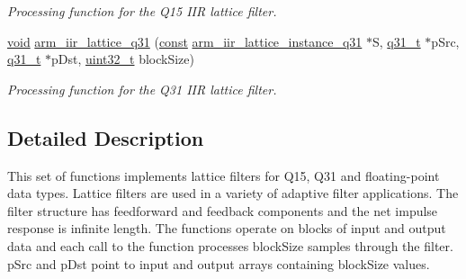\begin{DoxyCompactItemize}
\begin{DoxyCompactList}\small\item\em Processing function for the Q15 I\-I\-R lattice filter. \end{DoxyCompactList}\item 
\hyperlink{group___n_a_m_e_ga18028b8badbf1ea7e704ccac3c488e82}{void} \hyperlink{group___i_i_r___lattice_ga123b26fa9156cd8d3622dd85931741ed}{arm\-\_\-iir\-\_\-lattice\-\_\-q31} (\hyperlink{group___n_a_m_e_ga7ae6d0e43244213b34de2c2b9aa30da6}{const} \hyperlink{structarm__iir__lattice__instance__q31}{arm\-\_\-iir\-\_\-lattice\-\_\-instance\-\_\-q31} $\ast$S, \hyperlink{arm__math_8h_adc89a3547f5324b7b3b95adec3806bc0}{q31\-\_\-t} $\ast$p\-Src, \hyperlink{arm__math_8h_adc89a3547f5324b7b3b95adec3806bc0}{q31\-\_\-t} $\ast$p\-Dst, \hyperlink{stdint_8h_a435d1572bf3f880d55459d9805097f62}{uint32\-\_\-t} block\-Size)
\begin{DoxyCompactList}\small\item\em Processing function for the Q31 I\-I\-R lattice filter. \end{DoxyCompactList}\end{DoxyCompactItemize}


\subsection{Detailed Description}
This set of functions implements lattice filters for Q15, Q31 and floating-\/point data types. Lattice filters are used in a variety of adaptive filter applications. The filter structure has feedforward and feedback components and the net impulse response is infinite length. The functions operate on blocks of input and output data and each call to the function processes {\ttfamily block\-Size} samples through the filter. {\ttfamily p\-Src} and {\ttfamily p\-Dst} point to input and output arrays containing {\ttfamily block\-Size} values.

